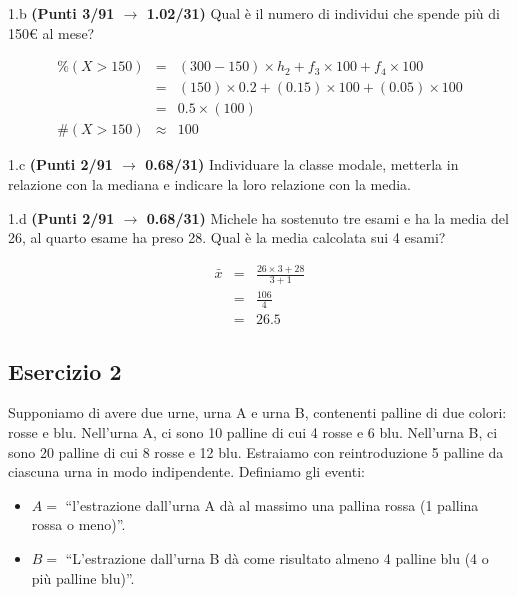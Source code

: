 \documentclass[
  11pt,
]{book}
\providecommand{\tightlist}{%
  \setlength{\itemsep}{0pt}\setlength{\parskip}{0pt}}
\theoremstyle{mytheoremstyle}
\theoremstyle{mydefstyle}
\newenvironment{sol}
  {
  \begin{tcolorbox}[enhanced,breakable,arc=0.1mm,boxrule=1pt,colback=white,colframe=iblue,
  title=\bf \fontfamily{lmss}\selectfont \hspace{.5 cm} Soluzione,drop fuzzy shadow]

}{
\end{tcolorbox}
  }
\begin{document}
1.b \textbf{(Punti 3/91 \(\rightarrow\) 1.02/31)} Qual è il numero di individui che spende più di 150€ al mese?

\begin{sol}
\begin{eqnarray*}
     \%(X> 150 ) &=& ( 300 - 150 )\times h_{ 2 }+ f_{ 3 }\times 100+f_{ 4 }\times 100 \\
              &=& ( 150 )\times 0.2 + ( 0.15 )\times 100+( 0.05 )\times 100 \\
              &=&  0.5 \times(100)\\
     \#(X> 150 ) &\approx& 100 
         \end{eqnarray*}

\end{sol}

1.c \textbf{(Punti 2/91 \(\rightarrow\) 0.68/31)} Individuare la classe modale, metterla in relazione con la mediana e indicare la loro relazione con la media.

1.d \textbf{(Punti 2/91 \(\rightarrow\) 0.68/31)} Michele ha sostenuto tre esami e ha la media del 26, al quarto esame ha preso 28. Qual è la media calcolata sui 4 esami?

\begin{sol}
\begin{eqnarray*}
  \bar x &=&\frac {26\times 3+28}{3+1}\\
  &=& \frac {106}{4}\\
  &=& 26.5
\end{eqnarray*}

\end{sol}

\subsection{Esercizio 2}\label{esercizio-2-34}

Supponiamo di avere due urne, urna A e urna B, contenenti palline di due colori: rosse e blu.
Nell'urna A, ci sono 10 palline di cui 4 rosse e 6 blu. Nell'urna B, ci sono 20 palline di cui 8 rosse e 12 blu.
Estraiamo con reintroduzione 5 palline da ciascuna urna in modo indipendente.
Definiamo gli eventi:

\begin{itemize}
\tightlist
\item
  \(A=\) ``l'estrazione dall'urna A dà al massimo una pallina rossa (1 pallina rossa o meno)''.
\item
  \(B=\) ``L'estrazione dall'urna B dà come risultato almeno 4 palline blu (4 o più palline blu)''.
\end{itemize}
\end{document}
